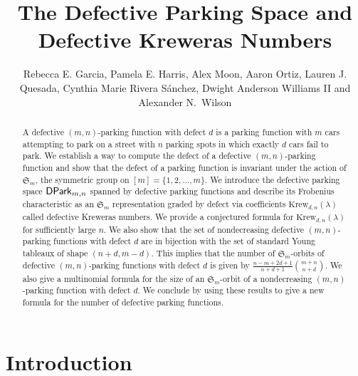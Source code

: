 \documentclass[11pt,reqno]{BICA}
\theoremstyle{definition}
\newcommand{\Krew}{\mathrm{Krew}}
\newcommand{\DPark}{{{\sf DPark}}}
\begin{document}
\title{The Defective Parking Space and Defective Kreweras Numbers}

\author{%
Rebecca E. Garcia,
Pamela E. Harris,
Alex Moon,
Aaron Ortiz,
Lauren J. Quesada,
Cynthia Marie Rivera S\'anchez,
Dwight Anderson Williams II
and
Alexander N.~Wilson
}


\begin{abstract}
A 
defective $(m,n)$-parking function with defect $d$ is a parking function with $m$ cars attempting to park on a street with $n$ parking spots in which exactly $d$ cars fail to park. 
We establish a way to compute the defect of a defective $(m,n)$-parking function and show that the defect of a parking function is invariant under the action of $\mathfrak{S}_m$, the symmetric group on $[m]=\{1,2,\ldots,m\}$. 
We introduce the defective parking space $\DPark_{m,n}$ spanned by defective parking functions and describe its Frobenius characteristic as an $\mathfrak{S}_m$ representation graded by defect via coefficients $\Krew_{d,n}(\lambda)$ called defective Kreweras numbers. We provide a conjectured formula for $\Krew_{d,n}(\lambda)$ for sufficiently large $n$.
We also show that the set of nondecreasing defective $(m,n)$-parking functions with defect $d$ are in bijection with the set of standard Young tableaux of shape $(n + d, m - d)$.  
This implies that the number of $\mathfrak{S}_m$-orbits of defective $(m,n)$-parking functions with defect $d$ is given by 
$\frac{n-m+2d+1}{n+d+1}\binom{m+n}{n+d}$. 
We also give a multinomial formula for the size of an $\mathfrak{S}_m$-orbit of a nondecreasing $(m,n)$-parking function with defect $d$. We conclude by using these results to give a new formula for the number of defective parking functions.
\end{abstract}
\maketitle

\section{Introduction}
\end{document}
